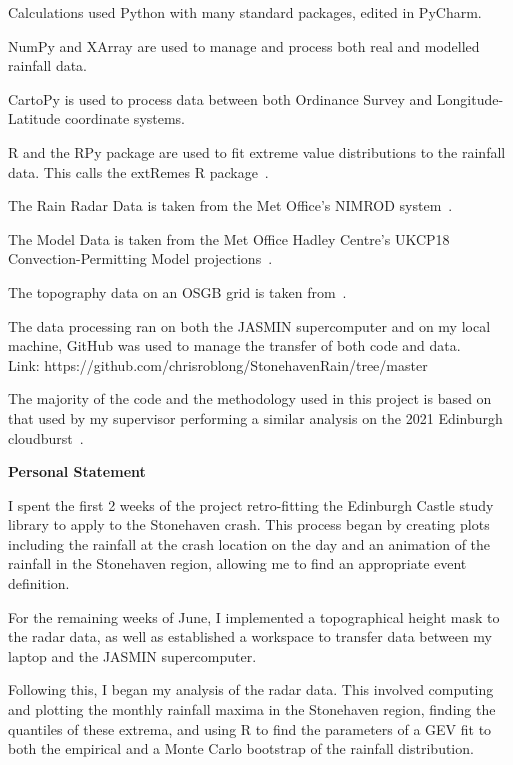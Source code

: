 \documentclass[12pt,a4paper,openany]{report}
\begin{document}
\bigskip

Calculations used Python with many standard packages, edited in PyCharm.

NumPy and XArray are used to manage and process both real and modelled rainfall data.

CartoPy is used to process data between both Ordinance Survey and Longitude-Latitude coordinate systems.

R and the RPy package are used to fit extreme value distributions to the rainfall data.
This calls the extRemes R package~\cite{extremes_R}.

The Rain Radar Data is taken from the Met Office's NIMROD system~\cite{radar_data}.

The Model Data is taken from the Met Office Hadley Centre's UKCP18 Convection-Permitting Model projections~\cite{model_data}.

The topography data on an OSGB grid is taken from~\cite{radar_topog}.

The data processing ran on both the JASMIN supercomputer and on my local machine,
GitHub was used to manage the transfer of both code and data. \\
Link: https://github.com/chrisroblong/StonehavenRain/tree/master

The majority of the code and the methodology used in this project is based on that used by my supervisor performing a similar analysis on the 2021 Edinburgh cloudburst~\cite{Tett_Soon}.


\newpage

\begin{center}
\textbf{Personal Statement}
\end{center}

I spent the first 2 weeks of the project retro-fitting the Edinburgh Castle study
library to apply to the Stonehaven crash.
This process began by creating plots including the
rainfall at the crash location on the day and an animation of the rainfall
in the Stonehaven region, allowing me to find an appropriate event definition.

For the remaining weeks of June, I implemented a topographical height mask
to the radar data, as well as established a workspace to transfer data between
my laptop and the JASMIN supercomputer.

Following this, I began my analysis of the radar data.
This involved computing and plotting the monthly rainfall maxima in
the Stonehaven region, finding the quantiles of these extrema,
and using R to find the parameters of a GEV fit to both the empirical
and a Monte Carlo bootstrap of the rainfall distribution.
\end{document}
